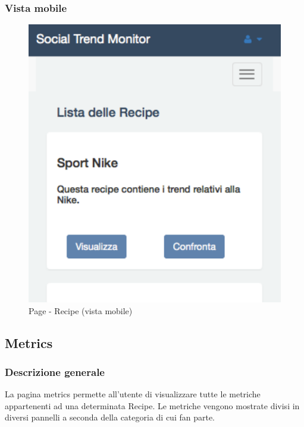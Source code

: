 		\subsubsection{Vista mobile} %
		\begin{figure}[!h]
			\centering
			\centerline{\includegraphics[scale=0.5]{./images/mockup/recipe_vm.pdf}}
			\caption{Page - Recipe (vista mobile)}
		\end{figure}

\clearpage

	\subsection{Metrics} %
	\label{sub:metrics}
		\subsubsection{Descrizione generale} %
		La pagina metrics permette all'utente di visualizzare tutte le metriche appartenenti ad una determinata Recipe. Le metriche vengono mostrate divisi in diversi pannelli a seconda della categoria di cui fan parte.

